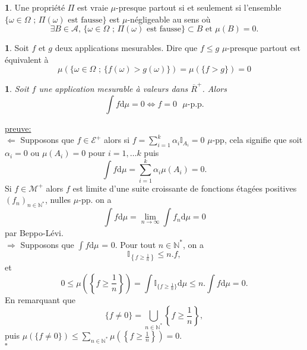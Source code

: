 \documentclass[8pt,notheorems]{beamer}
\def \N{\mathbb N}
\newtheorem{prop}{\translate{Proposition}}
\theoremstyle{definition}
\newtheorem{definition}{\translate{Definition}}
\theoremstyle{example}
\newtheorem{example}{\translate{Exemple}}
\theoremstyle{mystyle}
\theoremstyle{plain}
\begin{document}
\begin{frame}[allowframebreaks]

\begin{definition}
Une propriété $\Pi$ est vraie $\mu$-presque partout si et seulement si l'ensemble $\{\omega\in\Omega\text{ ; }\Pi(\omega)\text{  est fausse}\}$ est $\mu$-négligeable au sens où
$$
\exists B\in \mathcal{A}\text{, }\{\omega\in\Omega\text{ ; }\Pi(\omega)\text{  est fausse}\}\subset B\text{ et }\mu(B)=0.
$$
\end{definition}
\begin{example}
Soit $f$ et $g$ deux applications mesurables. Dire que $f\leq g$ $\mu$-presque partout est équivalent à 
$$
\mu(\{\omega\in \Omega\text{ ; }\{f(\omega)>g(\omega)\}) = \mu(\{f>g\}) = 0
$$
\end{example}
\begin{prop}
Soit $f$ une application mesurable à valeurs dans $\overline{R}^{+}$. Alors 
$$
\int f\text{d}\mu = 0 \Leftrightarrow f=0\text{ }\mu\text{-p.p.}
$$
\end{prop}
\underline{preuve:}\\
$\Leftarrow$ Supposons que $f\in \mathcal{E}^+$ alors si $f = \sum_{i = 1}^k\alpha_i\mathbb{I}_{A_i} =0$ $\mu$-pp, cela signifie que soit $\alpha_i = 0$ ou $\mu(A_i) = 0$ pour $i = 1,\ldots k$ puis 
$$\int f\text{d}\mu = \sum_{i = 1}^{k}\alpha_i\mu(A_i) = 0.$$
Si $f\in \mathcal{M}^{+}$ alors $f$ est limite d'une suite  croissante de fonctions étagées positives $(f_n)_{n\in\N^{\ast}}$, nulles $\mu$-pp. on a 
$$
\int f \text{d}\mu  = \underset{n\rightarrow\infty}{\lim} \int f_n\text{d}\mu = 0
$$
par Beppo-Lévi. \\
$\Rightarrow$ Supposons que $\int f\text{d}\mu$ = 0. Pour tout $n\in\N^{\ast}$, on a 
$$
\mathbb{I}_{\left\{f\geq \frac{1}{n}\right\}}\leq n.f,
$$
et 
$$
0\leq \mu\left(\left\{f\geq \frac{1}{n}\right\}\right) = \int \mathbb{I}_{\{f\geq \frac{1}{n}\}}\text{d}\mu\leq n.\int f\text{d}\mu =0.
$$
En remarquant que 
$$
\{f \neq 0\} = \bigcup_{n\in\N^{\ast}}\left\{f\geq \frac{1}{n}\right\},
$$
puis $\mu\left(\{f \neq 0\}\right) \leq \sum_{n\in\N^\ast}\mu\left(\left\{f\geq \frac{1}{n}\right\}\right) =  0.$\\
$\square$
\end{frame}
\end{document}
